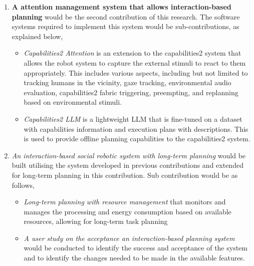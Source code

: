 \begin{enumerate}
    \item \textbf{A attention management system that allows interaction-based planning} would be the second contribution of this research. The software systems required to implement this system would be sub-contributions, as explained below,
    
    \begin{itemize}
    
        \item \textit{Capabilities2 Attention} is an extension to the capabilities2 system that allows the robot system to capture the external stimuli to react to them appropriately. This includes various aspects, including but not limited to tracking humans in the vicinity, gaze tracking, environmental audio evaluation, capabilities2 fabric triggering, preempting, and replanning based on environmental stimuli.

        \item \textit{Capabilities2 LLM} is a lightweight LLM that is fine-tuned on a dataset with capabilities information and execution plans with descriptions. This is used to provide offline planning capabilities to the capabilities2 system.

    \end{itemize}

    \item \textit{An interaction-based social robotic system with long-term planning} would be built utilising the system developed in previous contributions and extended for long-term planning in this contribution. Sub contribution would be as follows,

    \begin{itemize}

        \item \textit{Long-term planning with resource management} that monitors and manages the processing and energy consumption based on available resources, allowing for long-term task planning

        \item \textit{A user study on the acceptance an interaction-based planning system} would be conducted to identify the success and acceptance of the system and to identify the changes needed to be made in the available features.

    \end{itemize}
    
\end{enumerate}
